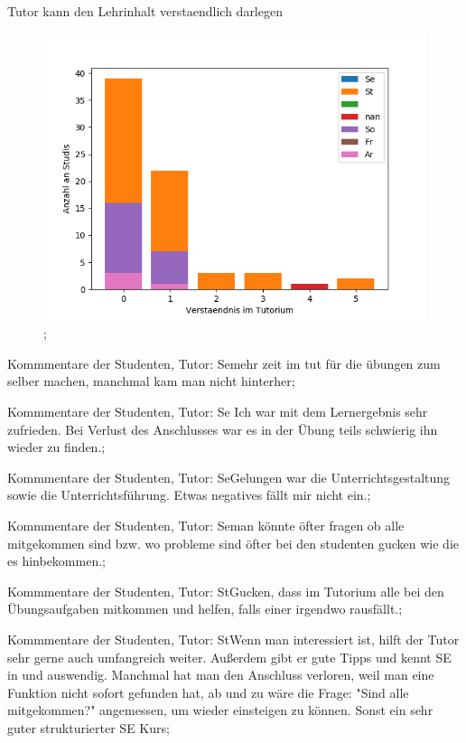 \documentclass[10pt]{beamer}
\begin{document}
\begin{frame}[fragile]{Tutor kann den Lehrinhalt verstaendlich darlegen} 
 \begin{figure}
 \includegraphics[width= 0.9\linewidth]{./PDFcreater/Plots/SolidEdge/Tutor+kann+den+Lehrinhalt+verstaendlich+darlegen.png};
 \end{figure}
 \end{frame}
\begin{frame}[fragile]{Kommmentare der Studenten, Tutor: Se}mehr zeit im tut für die übungen zum selber machen, manchmal kam man nicht hinterher;
 \end{frame}
\begin{frame}[fragile]{Kommmentare der Studenten, Tutor: Se} Ich war mit dem Lernergebnis sehr zufrieden.   Bei Verlust des Anschlusses war es in der Übung teils schwierig ihn wieder zu finden.;
 \end{frame}
\begin{frame}[fragile]{Kommmentare der Studenten, Tutor: Se}Gelungen war die Unterrichtsgestaltung sowie die Unterrichtsführung. Etwas negatives fällt mir nicht ein.;
 \end{frame}
\begin{frame}[fragile]{Kommmentare der Studenten, Tutor: Se}man könnte öfter fragen ob alle mitgekommen sind bzw. wo probleme sind    öfter bei den studenten gucken wie die es hinbekommen.;
 \end{frame}
\begin{frame}[fragile]{Kommmentare der Studenten, Tutor: St}Gucken, dass im Tutorium alle bei den Übungsaufgaben mitkommen und helfen, falls einer irgendwo rausfällt.;
 \end{frame}
\begin{frame}[fragile]{Kommmentare der Studenten, Tutor: St}Wenn man interessiert ist, hilft der Tutor sehr gerne auch umfangreich weiter. Außerdem gibt er gute Tipps und kennt SE in und auswendig. Manchmal hat man den Anschluss verloren, weil man eine Funktion nicht sofort gefunden hat, ab und zu wäre die Frage: "Sind alle mitgekommen?" angemessen, um wieder einsteigen zu können.
 Sonst ein sehr guter strukturierter SE Kurs;
 \end{frame}
\end{document}
